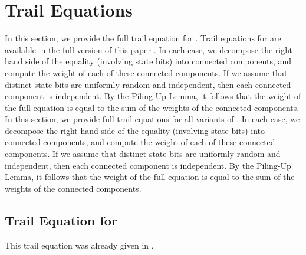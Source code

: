 
\section{Trail Equations}
\label{sec:traileq}

\ifcameraready
In this section, we provide the full trail equation for \MORUS[1280]. Trail equations for \MORUS[640] are available in the full version of this paper \cite{fullversion}. In each case, we decompose the right-hand side of the equality (involving state bits) into connected components, and compute the weight of each of these connected components. If we assume that distinct state bits are uniformly random and independent, then each connected component is independent. By the Piling-Up Lemma, it follows that the weight of the full equation is equal to the sum of the weights of the connected components.
\else
In this section, we provide full trail equations for all variants of \MORUS. In each case, we decompose the right-hand side of the equality (involving state bits) into connected components, and compute the weight of each of these connected components. If we assume that distinct state bits are uniformly random and independent, then each connected component is independent. By the Piling-Up Lemma, it follows that the weight of the full equation is equal to the sum of the weights of the connected components.
\fi

\ifcameraready
\else

\subsection{Trail Equation for \MiniMORUS[1280]}

This trail equation was already given in .

